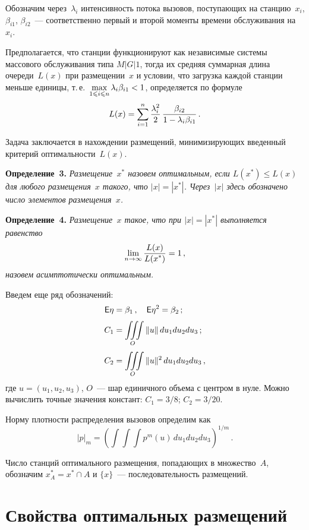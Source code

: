 \begin{multicols}{2}
Обозначим через~$\lambda_i$  интенсивность потока вызовов, поступающих на станцию~$x_i$,
$\beta_{i1}$, $\beta_{i2}$~--- соответственно первый и второй моменты времени обслуживания на~$x_i$.

Предполагается, что станции функционируют как независимые системы массового обслуживания типа
$M|G|1$, тогда их средняя суммарная длина очереди~$L(x)$ при размещении~$x$ и условии, что
загрузка каждой станции меньше единицы, т.\,е.\ $\max\limits_{1\leqslant i\leqslant n} \lambda_i
\beta_{i1}< 1 $, определяется по формуле
$$
L(x)=\sum\limits_{i=1}^{n}\displaystyle\frac{\displaystyle \lambda_i^2\mathstrut}{\displaystyle 2\mathstrut} \,\displaystyle\frac{\displaystyle \beta_{i2}\mathstrut}{\displaystyle 1-\lambda_i \beta_{i1}\mathstrut}\,.
$$
\smallskip

Задача заключается в нахождении размещений, минимизирующих введенный критерий оптимальности~$L(x)$.

\smallskip

\noindent
\textbf{Определение~3.} \textit{Размещение~$x^*$ назовем оптимальным, если $L(x^*)\leqslant L(x)$ для
любого размещения~$x$ такого, что $|x|=|x^*|$. Через~$|x|$ здесь обозначено число элементов
размещения~$x$.}

\smallskip

\noindent
\textbf{Определение~4.} \textit{Размещение~$x$ такое, что при $|x|=|x^*|$ выполняется равенство
$$
\lim\limits_{n\to\infty} \displaystyle\frac{\displaystyle L(x)\mathstrut}{\displaystyle L(x^*)\mathstrut}=1\,,
$$
назовем асимптотически оптимальным.}
\columnbreak


Введем еще ряд обозначений:
\begin{align*}
\e\eta&=\beta_1\,,\quad \e\eta^2=\beta_2\,;\\
C_1&=\int\!\!\!\il{O}\!\!\!\!\int \|u\|\,du_1du_2du_3\,;\\
 C_2&=\int\!\!\!\il{O}\!\!\!\!\int\|u\|^2\,du_1du_2du_3\,,
\end{align*}
где $u=(u_1,u_2,u_3)$, $O$~--- шар единичного объема с центром в нуле.
Можно вычислить точные значения констант: $C_1=3/8$; $C_2=3/20$.

Норму плотности распределения вызовов определим как
$$
|p|_m=\left(\int\!\!\!\int\!\!\!\int p^m(u)\,du_1du_2du_3\right)^{1/m}\,.
$$

Число станций оптимального размещения, попадающих в множество~$A$, обозначим
$
x_A^*=x^*\cap A$ и $\{x\}$~--- последовательность размещений.

\section{Свойства оптимальных размещений}


\end{multicols}
